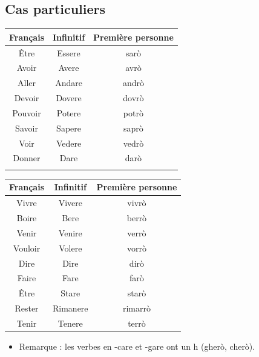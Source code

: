 \documentclass[12pt, openany]{report}
\begin{document}
\subsection{Cas particuliers}
\begin{minipage}{.478\textwidth}
    \begin{center}
        \begin{tabular}{c|c|c}
            Français & Infinitif & Première personne \\ \hline 
            Être & Essere & sarò\\ 
            Avoir & Avere & avrò\\
            Aller & Andare & andrò\\
            Devoir & Dovere & dovrò\\
            Pouvoir & Potere & potrò\\
            Savoir & Sapere & saprò\\
            Voir & Vedere & vedrò\\
            Donner & Dare & darò\\
            &&\\
        \end{tabular}
    \end{center}
\end{minipage}
\begin{minipage}{.478\textwidth}
    \begin{center}
        \begin{tabular}{c|c|c}
            Français & Infinitif & Première personne \\ \hline
            Vivre & Vivere & vivrò\\
            Boire & Bere & berrò\\
            Venir & Venire & verrò\\ 
            Vouloir & Volere & vorrò\\
            Dire & Dire & dirò\\
            Faire & Fare & farò\\
            Être & Stare & starò\\
            Rester & Rimanere & rimarrò \\
            Tenir & Tenere & terrò\\
        \end{tabular}
    \end{center}
\end{minipage}
\begin{itemize}
    \item [$\to$] Remarque : les verbes en -care et -gare ont un h (gherò, cherò).
\end{itemize}
\end{document}
